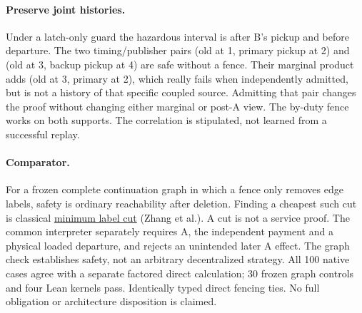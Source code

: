 \documentclass{article}
\begin{document}
\paragraph{Preserve joint histories.}
Under a latch-only guard the hazardous interval is after B's pickup and
before departure. The two timing/publisher pairs (old at 1, primary
pickup at 2) and (old at 3, backup pickup at 4) are safe without a fence.
Their marginal product adds (old at 3, primary at 2), which really
fails when independently admitted, but is not a history of that specific
coupled source. Admitting that pair changes the proof without changing
either marginal or post-A view. The by-duty fence works on both supports.
The correlation is stipulated, not learned from a successful replay.

\paragraph{Comparator.}
For a frozen complete continuation graph in which a fence only removes
edge labels, safety is ordinary reachability after deletion. Finding
a cheapest such cut is classical
\href{https://pages.cs.wisc.edu/~jyc/papers/label-cut.pdf}{minimum label cut}
(Zhang et al.). A cut is not a service proof. The common interpreter
separately requires A, the independent payment and a physical loaded
departure, and rejects an unintended later A effect. The graph check
establishes safety, not an arbitrary decentralized strategy.
All 100 native cases agree with a separate factored direct calculation;
30 frozen graph controls and four Lean kernels pass. Identically typed
direct fencing ties. No full obligation or architecture disposition is claimed.
\end{document}
